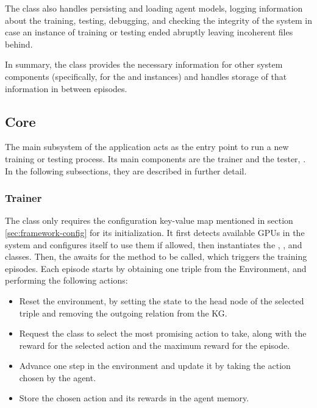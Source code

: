 The  class also handles persisting and loading agent models, logging information about the training, testing, debugging, and checking the integrity of the system in case an instance of training or testing ended abruptly leaving incoherent files behind.

In summary, the  class provides the necessary information for other system components (specifically, for the  and  instances) and handles storage of that information in between episodes.

\subsection{Core}\label{sec:framework-core}
The main subsystem of the application acts as the entry point to run a new training or testing process. Its main components are the trainer  and the tester, . In the following subsections, they are described in further detail.

\subsubsection{Trainer}
The  class only requires the configuration key-value map mentioned in section \ref{sec:framework-config} for its initialization. It first detects available GPUs in the system and configures itself to use them if allowed, then instantiates the , , and  classes.
Then, the  awaits for the  method to be called, which triggers the training episodes. Each episode starts by obtaining one triple from the Environment, and performing the following actions:

\begin{itemize}
    \item Reset the environment, by setting the state to the head node of the selected triple and removing the outgoing relation from the KG.
    \item Request the  class to select the most promising action to take, along with the reward for the selected action and the maximum reward for the episode.
    \item Advance one step in the environment and update it by taking the action chosen by the agent.
    \item Store the chosen action and its rewards in the agent memory.
\end{itemize}

